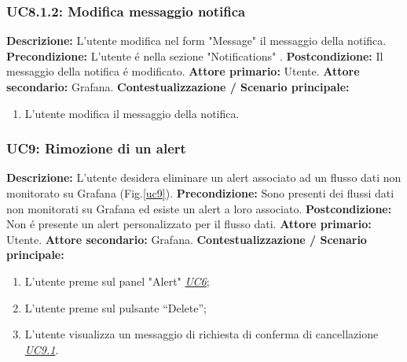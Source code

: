                 \subsubsection{UC8.1.2: Modifica messaggio notifica }
                    \textbf{Descrizione:} L’utente modifica nel form "Message" il messaggio della notifica.
                    \newline
                    \textbf{Precondizione:} L'utente é nella sezione "Notifications" .
                    \newline
                    \textbf{Postcondizione:} Il messaggio della notifica é modificato.
                    \newline
                    \textbf{Attore primario:} Utente.
                    \newline
                    \textbf{Attore secondario:} Grafana.
                    \newline
                    \textbf{Contestualizzazione / Scenario principale:} \begin{enumerate}
                            \item L'utente modifica il messaggio della notifica.
                        \end{enumerate} 		
                		
                		
                		
                    
                \subsubsection{UC9: Rimozione di un alert}
                    \textbf{Descrizione:}  L’utente desidera eliminare un alert associato ad un flusso dati non monitorato su Grafana (Fig.\ref{uc9}).
                    \newline
                    \textbf{Precondizione:} Sono presenti dei flussi dati non monitorati su Grafana ed esiste un alert a loro associato.
                    \newline
                    \textbf{Postcondizione:} Non é presente un alert personalizzato per il flusso dati.
                    \newline
                    \textbf{Attore primario:} Utente.
                    \newline
                    \textbf{Attore secondario:} Grafana.
                    \newline
                    \textbf{Contestualizzazione / Scenario principale:} \begin{enumerate}
                            \item L'utente preme sul panel "Alert" \underline{\textit{UC6}};
                            \item L’utente preme sul pulsante “Delete”;
                            \item L’utente visualizza un messaggio di richiesta di conferma di cancellazione \underline{\textit{UC9.1}}.
                        \end{enumerate}
                    
